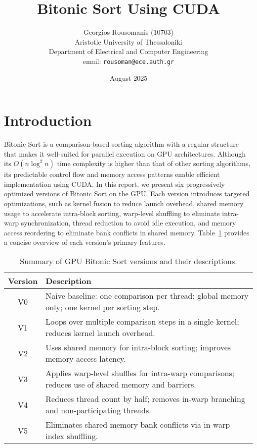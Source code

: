 \documentclass{article}
\title{Bitonic Sort Using CUDA}
\author{Georgios Rousomanis (10703) \\
Aristotle University of Thessaloniki \\
Department of Electrical and Computer Engineering \\
email: \texttt{rousoman@ece.auth.gr}
}
\date{August 2025}
\begin{document}
\maketitle

\section*{Introduction}

Bitonic Sort is a comparison-based sorting algorithm with a regular structure that makes it well-suited 
for parallel execution on GPU architectures. Although its $O(n \log^2 n)$ time complexity is higher than 
that of other sorting algorithms, its predictable control flow and memory access patterns enable efficient 
implementation using CUDA. In this report, we present six progressively optimized versions of Bitonic Sort 
on the GPU. Each version introduces targeted optimizations, such as kernel fusion to reduce launch overhead, 
shared memory usage to accelerate intra-block sorting, warp-level shuffling to eliminate intra-warp 
synchronization, thread reduction to avoid idle execution, and memory access reordering to eliminate bank 
conflicts in shared memory. Table~\ref{tab:version_summary} provides a concise overview of each version's 
primary features.

\begin{table}[h!]
\centering
\renewcommand{\arraystretch}{1.2}
\begin{tabular}{|c|p{11cm}|}
\hline
\textbf{Version} & \textbf{Description} \\
\hline
V0 & Naive baseline: one comparison per thread; global memory only; one kernel per sorting step. \\
\hline
V1 & Loops over multiple comparison steps in a single kernel; reduces kernel launch overhead. \\
\hline
V2 & Uses shared memory for intra-block sorting; improves memory access latency. \\
\hline
V3 & Applies warp-level shuffles for intra-warp comparisons; reduces use of shared memory and barriers. \\
\hline
V4 & Reduces thread count by half; removes in-warp branching and non-participating threads. \\
\hline
V5 & Eliminates shared memory bank conflicts via in-warp index shuffling. \\
\hline
\end{tabular}
\caption{Summary of GPU Bitonic Sort versions and their descriptions.}
\label{tab:version_summary}
\end{table}
\end{document}
